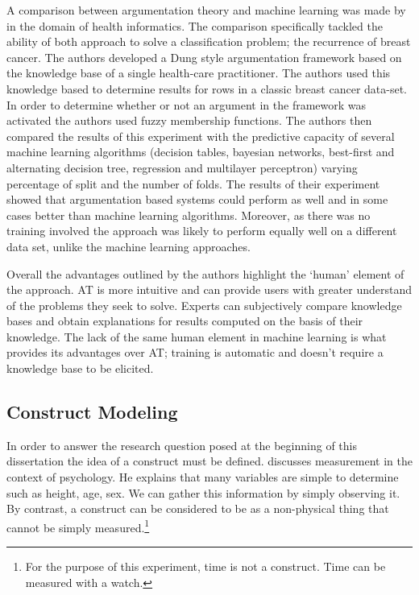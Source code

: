 A comparison between argumentation theory and machine learning was made by \cite{longo2012argumentation} in the domain of health informatics. The comparison specifically tackled the ability of both approach to solve a classification problem; the recurrence of breast cancer. The authors developed a Dung style argumentation framework based on the knowledge base of a single health-care practitioner. The authors used this knowledge based to determine results for rows in a classic breast cancer data-set. In order to determine whether or not an argument in the framework was activated the authors used fuzzy membership functions. The authors then compared the results of this experiment with the predictive capacity of several machine learning algorithms (decision tables, bayesian networks, best-first and alternating decision tree, regression and multilayer perceptron) varying percentage of split and the number of folds. The results of their experiment showed that argumentation based systems could perform as well and in some cases better than machine learning algorithms. Moreover, as there was no training involved the approach was likely to perform equally well on a different data set, unlike the machine learning approaches.

Overall the advantages outlined by the authors highlight the `human' element of the approach. AT is more intuitive and can provide users with greater understand of the problems they seek to solve. Experts can subjectively compare knowledge bases and obtain explanations for results computed on the basis of their knowledge. The lack of the same human element in machine learning is what provides its advantages over AT; training is automatic and doesn't require a knowledge base to be elicited. 


\subsection{Construct Modeling}

In order to answer the research question posed at the beginning of this dissertation the idea of a construct must be defined.
\cite{price2013research} discusses measurement in the context of psychology. He explains that many variables are simple to determine such as height, age, sex. We can gather this information by simply observing it. By contrast, a construct can be considered to be as a non-physical thing that cannot be simply measured.\footnote{For the purpose of this experiment, time is not a construct. Time can be measured with a watch.} 

